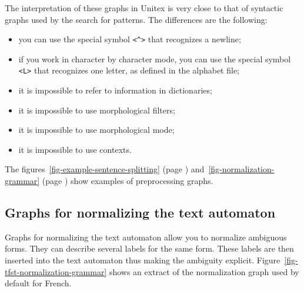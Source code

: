 \bigskip
\noindent The interpretation of these graphs in Unitex is very close to that of
syntactic graphs used by the search for patterns. The differences are the following:
\begin{itemize}
  \item you can use the special symbol \verb+<^>+ that recognizes a newline;\index{\verbc{<^>}}
  \item if you work in character by character mode, you can use the special
  symbol \verb+<L>+ that recognizes one letter, as defined in
  the alphabet file;
  \item it is impossible to refer to information in dictionaries;
  \item it is impossible to use morphological filters;
  \item it is impossible to use morphological mode;
  \item it is impossible to use contexts.
\end{itemize}

The figures~\ref{fig-example-sentence-splitting} (page
\pageref{fig-example-sentence-splitting})
and~\ref{fig-normalization-grammar} (page
\pageref{fig-normalization-grammar}) show examples of preprocessing graphs.


\subsection{Graphs for normalizing the text automaton}
\label{section-normalizing-text-automataon}
Graphs for normalizing the text automaton allow you to normalize
ambiguous forms. They can describe several labels for the same form.
These labels are then inserted into the text automaton thus making the
ambiguity explicit. Figure~\ref{fig-tfst-normalization-grammar} shows an
extract of the normalization graph used by default for French.

